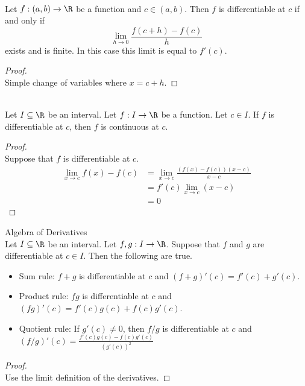 \documentclass[a4paper]{article}
\begin{document}
\begin{lmm}{}{}\\ Let $f:(a,b)\to\R$ be a function and $c\in(a,b)$. Then $f$ is differentiable at $c$ if and only if $$\lim_{h\to 0}\frac{f(c+h)-f(c)}{h}$$ exists and is finite. In this case this limit is equal to $f'(c)$. 
\begin{proof}\\
Simple change of variables where $x=c+h$. 
\end{proof}
\end{lmm}

\begin{prp}{}{}\\
Let $I\subseteq\R$ be an interval. Let $f:I\to\R$ be a function. Let $c\in I$. If $f$ is differentiable at $c$, then $f$ is continuous at $c$. 
\begin{proof}\\ Suppose that $f$ is differentiable at $c$. 
\begin{align*}
\lim_{x\to c}f(x)-f(c)&=\lim_{x\to c}\frac{(f(x)-f(c))(x-c)}{x-c}\\
&=f'(c)\lim_{x\to c}(x-c)\\
&=0
\end{align*}
\end{proof}
\end{prp}

\begin{thm}{Algebra of Derivatives}{}\\
Let $I\subseteq\R$ be an interval. Let $f,g:I\to\R$. Suppose that $f$ and $g$ are differentiable at $c\in I$. Then the following are true. 
\begin{itemize}
\item Sum rule: $f+g$ is differentiable at $c$ and $(f+g)'(c)=f'(c)+g'(c)$. 
\item Product rule: $fg$ is differentiable at $c$ and $(fg)'(c)=f'(c)g(c)+f(c)g'(c)$. 
\item Quotient rule: If $g'(c)\neq 0$, then $f/g$ is differentiable at $c$ and $(f/g)'(c)=\frac{f'(c)g(c)-f(c)g'(c)}{(g'(c))^2}$
\end{itemize}
\begin{proof}\\
Use the limit definition of the derivatives. 
\end{proof}
\end{thm}
\end{document}
